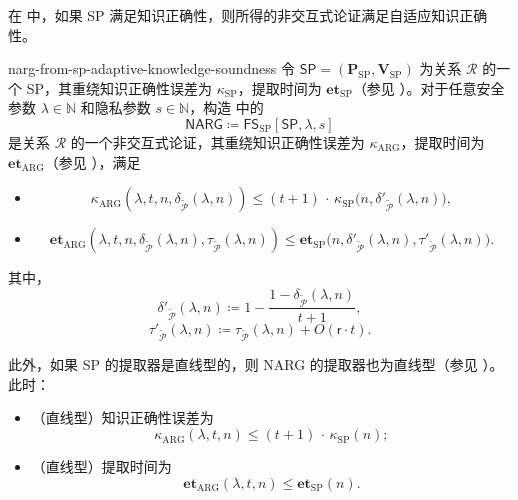 \documentclass[american,singlepageview]{snargs-book-zh}
\newcommand{\Malicious}[1]{\tilde{#1}}
\newcommand{\DefineEqual}{\coloneqq}
\newcommand{\Naturals}{\mathbb{N}}
\newcommand{\Relation}{\mathcal{R}}
\newcommand{\InstanceSize}{n}
\newcommand{\ProtoProver}{P}
\newcommand{\ProtoVerifier}{V}
\newcommand{\ProtoKnowledgeError}{\kappa}
\newcommand{\ProtoKnowledgeTime}{\mathbf{et}}
\newcommand{\ProtoRandomnessComplexity}{\mathsf{r}}
\newcommand{\SPSymbol}{\mathsf{SP}}
\newcommand{\SPSubscript}{\scriptscriptstyle\mathrm{SP}}
\newcommand{\SPFormat}[1]{\mathbf{#1}}
\newcommand{\SPProver}{\SPFormat{\ProtoProver}_{\SPSubscript}}
\newcommand{\SPVerifier}{\SPFormat{\ProtoVerifier}_{\SPSubscript}}
\newcommand{\SPKnowledgeError}{\ProtoKnowledgeError_{\SPSubscript}}
\newcommand{\SPKnowledgeTime}{\ProtoKnowledgeTime_{\SPSubscript}}
\newcommand{\SPSystem}{(\SPProver,\SPVerifier)}
\newcommand{\SPRandomnessComplexity}{\ProtoRandomnessComplexity}
\newcommand{\NARGSymbol}{\mathsf{NARG}}
\newcommand{\ARGSubscript}{\scriptscriptstyle\mathrm{ARG}}
\newcommand{\ARGFormat}[1]{\mathcal{#1}}
\newcommand{\ARGProver}{\ARGFormat{\ProtoProver}}
\newcommand{\ARGKnowledgeTime}{\ProtoKnowledgeTime_{\ARGSubscript}}
\newcommand{\ARGKnowledgeError}{\ProtoKnowledgeError_{\ARGSubscript}}
\newcommand{\ProverFailureProbability}[1]{\delta_{#1}}
\newcommand{\ProverFailureProbabilityPrime}[1]{\delta'_{#1}}
\newcommand{\ProverRunningTime}[1]{\tau_{#1}}
\newcommand{\ProverRunningTimePrime}[1]{\tau'_{#1}}
\newcommand{\ROQueryBound}{t}
\newcommand{\SecurityParameter}{\lambda}
\newcommand{\PrivacyParameter}{s}
\newcommand{\FormatTransName}[1]{\bm{\mathsf{#1}}}
\newcommand{\FSonSPSymbol}{\FormatTransName{FS}_{\SPSubscript}}
\newcommand{\FormatTransInputs}[3]{[#1,#2,#3]}
\newcommand{\FSonSPTransformation}[3]{\FSonSPSymbol\FormatTransInputs{#1}{#2}{#3}}
\begin{document}
在  中，如果 SP 满足知识正确性，则所得的非交互式论证满足自适应知识正确性。

\begin{ImportantTheorem}{}{narg-from-sp-adaptive-knowledge-soundness}
令 $\SPSymbol=\SPSystem$ 为关系 $\Relation$ 的一个 SP，其重绕知识正确性误差为 $\SPKnowledgeError$，提取时间为 $\SPKnowledgeTime$（参见 ）。对于任意安全参数 $\SecurityParameter\in\Naturals$ 和隐私参数 $\PrivacyParameter\in\Naturals$，构造  中的
\[
  \NARGSymbol \DefineEqual \FSonSPTransformation{\SPSymbol}{\SecurityParameter}{\PrivacyParameter}
\]
是关系 $\Relation$ 的一个非交互式论证，其重绕知识正确性误差为 $\ARGKnowledgeError$，提取时间为 $\ARGKnowledgeTime$（参见 ），满足
\begin{itemize}[nolistsep]
  \item 
  \[
    \ARGKnowledgeError(\SecurityParameter,\ROQueryBound,\InstanceSize,\ProverFailureProbability{\Malicious{\ARGProver}}(\SecurityParameter,\InstanceSize))
    \le
    (\ROQueryBound+1)\,\cdot\,
    \SPKnowledgeError\bigl(\InstanceSize,\ProverFailureProbabilityPrime{\Malicious{\ARGProver}}(\SecurityParameter,\InstanceSize)\bigr),
  \]
  \item 
  \[
    \ARGKnowledgeTime(\SecurityParameter,\ROQueryBound,\InstanceSize,\ProverFailureProbability{\Malicious{\ARGProver}}(\SecurityParameter,\InstanceSize),\ProverRunningTime{\Malicious{\ARGProver}}(\SecurityParameter,\InstanceSize))
    \le
    \SPKnowledgeTime\bigl(\InstanceSize,\ProverFailureProbabilityPrime{\Malicious{\ARGProver}}(\SecurityParameter,\InstanceSize),\ProverRunningTimePrime{\Malicious{\ARGProver}}(\SecurityParameter,\InstanceSize)\bigr).
  \]
\end{itemize}
其中，
\[
  \ProverFailureProbabilityPrime{\Malicious{\ARGProver}}(\SecurityParameter,\InstanceSize)
  \DefineEqual
  1
  -
  \frac{1 - \ProverFailureProbability{\Malicious{\ARGProver}}(\SecurityParameter,\InstanceSize)}
       {\ROQueryBound+1},
\]
\[
  \ProverRunningTimePrime{\Malicious{\ARGProver}}(\SecurityParameter,\InstanceSize)
  \DefineEqual
  \ProverRunningTime{\Malicious{\ARGProver}}(\SecurityParameter,\InstanceSize)
  + O(\SPRandomnessComplexity \cdot \ROQueryBound).
\]

此外，如果 SP 的提取器是直线型的，则 NARG 的提取器也为直线型（参见 ）。此时：
\begin{itemize}[nolistsep]
  \item （直线型）知识正确性误差为
  \[
    \ARGKnowledgeError(\SecurityParameter,\ROQueryBound,\InstanceSize)
    \le
    (\ROQueryBound+1)\,\cdot\,\SPKnowledgeError(\InstanceSize);
  \]
  \item （直线型）提取时间为
  \[
    \ARGKnowledgeTime(\SecurityParameter,\ROQueryBound,\InstanceSize)
    \le
    \SPKnowledgeTime(\InstanceSize).
  \]
\end{itemize}
\end{ImportantTheorem}
\end{document}
